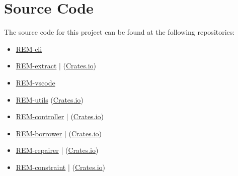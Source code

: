 \section*{Source Code}

The source code for this project can be found at the following repositories:
\begin{itemize}
    \item \href{https://github.com/RuleBrittonica/rem-cli}{REM-cli}
    \item \href{https://github.com/RuleBrittonica/rem-extract}{REM-extract}
    | (\href{https://crates.io/crates/rem-extract}{Crates.io})
    \item \href{https://github.com/RuleBrittonica/rem-vscode}{REM-vscode}
    \item \href{https://github.com/RuleBrittonica/rem-utils}{REM-utils}
    (\href{https://crates.io/crates/rem-utils}{Crates.io})
    \item \href{https://github.com/RuleBrittonica/rem-controller}{REM-controller}
    | (\href{https://crates.io/crates/rem-controller}{Crates.io})
    \item \href{https://github.com/RuleBrittonica/rem-borrower}{REM-borrower}
    | (\href{https://crates.io/crates/rem-borrower}{Crates.io})
    \item \href{https://github.com/RuleBrittonica/rem-repairer}{REM-repairer}
    | (\href{https://crates.io/crates/rem-repairer}{Crates.io})
    \item
    \href{https://github.com/RuleBrittonica/rem-constraint}{REM-constraint}
    | (\href{https://crates.io/crates/rem-contraint}{Crates.io})
\end{itemize}